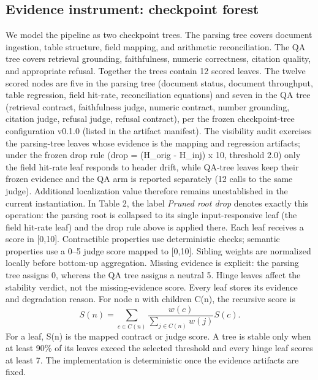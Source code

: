 \documentclass[10pt,conference]{IEEEtran}
\begin{document}
\subsection{Evidence instrument: checkpoint forest}
We model the pipeline as two checkpoint trees. The parsing tree covers document ingestion, table structure, field mapping, and arithmetic reconciliation. The QA tree covers retrieval grounding, faithfulness, numeric correctness, citation quality, and appropriate refusal. Together the trees contain 12 scored leaves.
The twelve scored nodes are five in the parsing tree (document status, document throughput, table regression, field hit-rate, reconciliation equations) and seven in the QA tree (retrieval contract, faithfulness judge, numeric contract, number grounding, citation judge, refusal judge, refusal contract), per the frozen checkpoint-tree configuration v0.1.0 (listed in the artifact manifest). The visibility audit exercises the parsing-tree leaves whose evidence is the mapping and regression artifacts; under the frozen drop rule (drop = (H\_orig - H\_inj) x 10, threshold 2.0) only the field hit-rate leaf responds to header drift, while QA-tree leaves keep their frozen evidence and the QA arm is reported separately (12 calls to the same judge). Additional localization value therefore remains unestablished in the current instantiation. In Table 2, the label \emph{Pruned root drop} denotes exactly this operation: the parsing root is collapsed to its single input-responsive leaf (the field hit-rate leaf) and the drop rule above is applied there.
Each leaf receives a score in [0,10]. Contractible properties use deterministic checks; semantic properties use a 0–5 judge score mapped to [0,10]. Sibling weights are normalized locally before bottom-up aggregation. Missing evidence is explicit: the parsing tree assigns 0, whereas the QA tree assigns a neutral 5. Hinge leaves affect the stability verdict, not the missing-evidence score. Every leaf stores its evidence and degradation reason.
For node n with children C(n), the recursive score is
\[
S(n)=\sum_{c\in C(n)} \frac{w(c)}{\sum_{j\in C(n)}w(j)}S(c).
\]
For a leaf, S(n) is the mapped contract or judge score. A tree is stable only when at least 90\% of its leaves exceed the selected threshold and every hinge leaf scores at least 7. The implementation is deterministic once the evidence artifacts are fixed.
\end{document}
